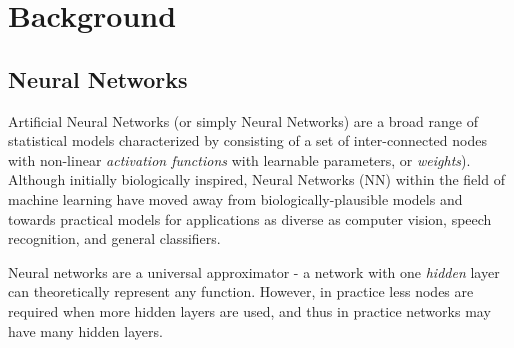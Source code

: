 \documentclass[thesis]{subfiles}
\begin{document}

\chapter{Background}
\label{background}

\section{Neural Networks}
Artificial Neural Networks (or simply Neural Networks) are a broad range of statistical models characterized by consisting of a set of inter-connected nodes with non-linear \emph{activation functions} with learnable parameters, or \emph{weights}). Although initially biologically inspired, Neural Networks (NN) within the field of machine learning have moved away from biologically-plausible models and towards practical models for applications as diverse as computer vision, speech recognition, and general classifiers.

Neural networks are a universal approximator - a network with one \emph{hidden} layer can theoretically represent any function. However, in practice less nodes are required when more hidden layers are used, and thus in practice networks may have many hidden layers.



\end{document}
